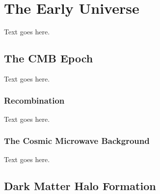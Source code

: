 
%
%

\section{The Early Universe}
\label{sec:early_universe}



Text goes here.




\subsection{The CMB Epoch}
\label{subsec:early_universe--cmb_epoch}


Text goes here.



\subsubsection{Recombination}
\label{subsubsec:early_universe--cmb_epoch--recombination}


Text goes here.



\subsubsection{The Cosmic Microwave Background}
\label{subsubsec:early_universe--cmb_epoch--cmb}


Text goes here.




\subsection{Dark Matter Halo Formation}
\label{subsec:early_universe--dm_halo_formation}


